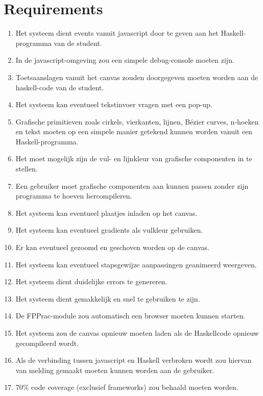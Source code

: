 \section{Requirements} \label{sec:requirements}

\begin{enumerate}[{R}1]
	\item Het systeem dient events vanuit javascript door te geven aan het Haskell-programma van de student.
	\item In de javascript-omgeving zou een simpele debug-console moeten zijn.
	\item Toetsaanslagen vanuit het canvas zouden doorgegeven moeten worden aan de haskell-code van de student. 
	\item Het systeem kan eventueel tekstinvoer vragen met een pop-up.
	\item Grafische primitieven zoals cirkels, vierkanten, lijnen, Bézier curves, n-hoeken en tekst moeten op een simpele manier getekend kunnen worden vanuit een Haskell-programma.
	\item Het moet mogelijk zijn de vul- en lijnkleur van grafische componenten in te stellen.
	\item Een gebruiker moet grafische componenten aan kunnen passen zonder zijn programma te hoeven hercompileren.
	\item Het systeem kan eventueel plaatjes inladen op het canvas.
	\item Het systeem kan eventueel gradients als vulkleur gebruiken.
	\item Er kan eventueel gezoomd en geschoven worden op de canvas.
	\item Het systeem kan eventueel stapsgewijze aanpassingen geanimeerd weergeven.
	\item Het systeem dient duidelijke errors te genereren.
	\item Het systeem dient gemakkelijk en snel te gebruiken te zijn.
	\item De FPPrac-module zou automatisch een browser moeten kunnen starten.
	\item  Het systeem zou de canvas opnieuw moeten laden als de Haskellcode opnieuw gecompileerd wordt.
	\item Als de verbinding tussen javascript en Haskell verbroken wordt zou hiervan van melding gemaakt moeten kunnen worden aan de gebruiker. 
	\item 70\% code coverage (exclusief frameworks) zou behaald moeten worden.
\end{enumerate}